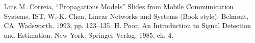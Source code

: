 \documentclass[letterpaper, 10 pt, conference]{ieeeconf}  %
\begin{document}
















\begin{thebibliography}{99}

 Luis M. Correia, ``Propagations Models'' 	Slides from Mobile Communication Systems, IST.
 W.-K. Chen, Linear Networks and Systems (Book style).	Belmont, CA: Wadsworth, 1993, pp. 123--135.
 H. Poor, An Introduction to Signal Detection and Estimation.   New York: Springer-Verlag, 1985, ch. 4.

\end{thebibliography}
\end{document}
